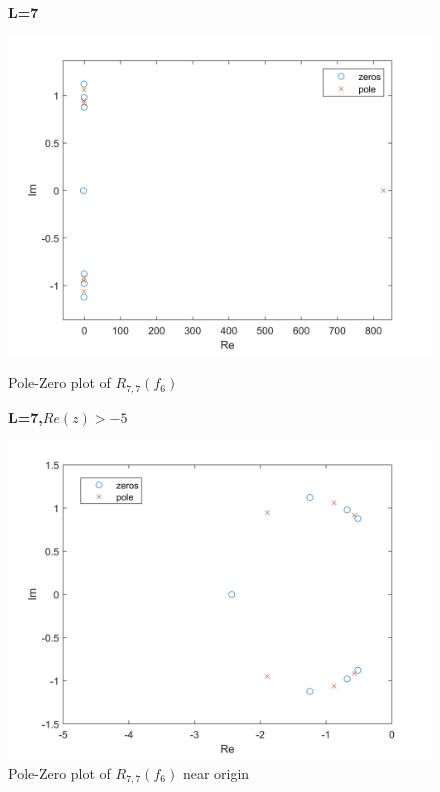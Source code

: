 \documentclass[10pt]{article}
\begin{document}
\begin{figure}[H]
    \begin{minipage}[b]{0.47\linewidth}
            \centering
            \textbf{L=7}\par
            \includegraphics[width=\textwidth]{Files/q5,f6,7.png}
            \caption{Pole-Zero plot of $R_{7,7}(f_6)$}
        \end{minipage}
        \hfill
            \begin{minipage}[b]{0.47\linewidth}
            \centering
    \textbf{L=7,$Re(z)>-5$}\par
    \includegraphics[width=\textwidth]{Files/q5,f6,7_ring.png}
    \caption{Pole-Zero plot of $R_{7,7}(f_6)$ near origin}
        \end{minipage}
\end{figure}
\end{document}
